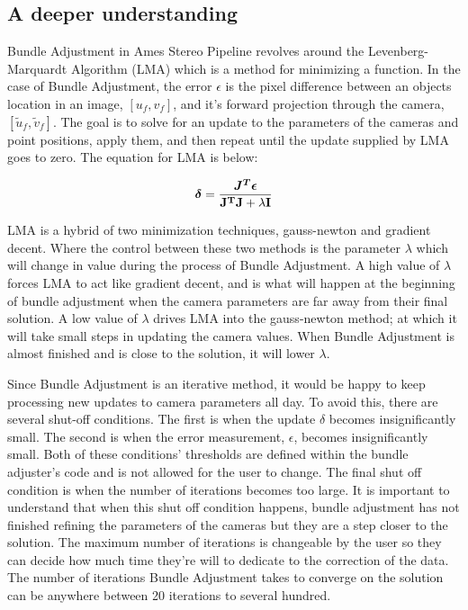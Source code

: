 \subsection{A deeper understanding}

Bundle Adjustment in Ames Stereo Pipeline revolves around the
Levenberg-Marquardt Algorithm (LMA) which is a method for minimizing a
function. In the case of Bundle Adjustment, the error $\epsilon$ is
the pixel difference between an objects location in an image,
$[u_{f},v_{f}]$, and it's forward projection through the camera,
$[\tilde{u}_{f},\tilde{v}_{f}]$. The goal is to solve for an update to
the parameters of the cameras and point positions, apply them, and
then repeat until the update supplied by LMA goes to zero. The
equation for LMA is below:

\begin{equation}
\mbox{\boldmath$\delta$} = \frac{\mbox{\boldmath$J^T\epsilon$}}{\bf{J^TJ}+\lambda\bf{I}}
\label{eqn: Levenberg-Marquardt Algorithm}
\end{equation}

LMA is a hybrid of two minimization techniques, gauss-newton and
gradient decent. Where the control between these two methods is the
parameter $\lambda$ which will change in value during the process of
Bundle Adjustment. A high value of $\lambda$ forces LMA to act like
gradient decent, and is what will happen at the beginning of bundle
adjustment when the camera parameters are far away from their final
solution. A low value of $\lambda$ drives LMA into the gauss-newton
method; at which it will take small steps in updating the camera
values. When Bundle Adjustment is almost finished and is close to the
solution, it will lower $\lambda$.

Since Bundle Adjustment is an iterative method, it would be happy to
keep processing new updates to camera parameters all day. To avoid
this, there are several shut-off conditions. The first is when the
update {\boldmath$\delta$} becomes insignificantly small. The second
is when the error measurement, {\boldmath$\epsilon$}, becomes
insignificantly small. Both of these conditions' thresholds are
defined within the bundle adjuster's code and is not allowed for the
user to change. The final shut off condition is when the number of
iterations becomes too large. It is important to understand that when
this shut off condition happens, bundle adjustment has not finished
refining the parameters of the cameras but they are a step closer to
the solution. The maximum number of iterations is changeable by the
user so they can decide how much time they're will to dedicate to the
correction of the data. The number of iterations Bundle Adjustment
takes to converge on the solution can be anywhere between 20
iterations to several hundred.

